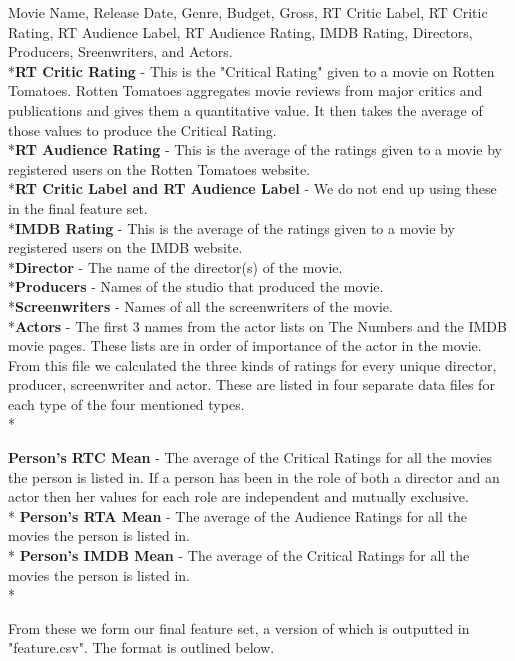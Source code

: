 \documentclass[conference]{IEEEtran}
\begin{document}
Movie Name, Release Date, Genre, Budget, Gross, RT Critic Label, RT Critic Rating, RT Audience Label, RT Audience Rating, IMDB Rating, Directors, Producers, Sreenwriters, and Actors.
\\*\textbf{RT Critic Rating} - This is the "Critical Rating" given to a movie on Rotten Tomatoes. Rotten Tomatoes aggregates movie reviews from major critics and publications and gives them a quantitative value. It then takes the average of those values to produce the Critical Rating.
\\*\textbf{RT Audience Rating} - This is the average of the ratings given to a movie by registered users on the Rotten Tomatoes website.
\\*\textbf{RT Critic Label and RT Audience Label} - We do not end up using these in the final feature set. 
\\*\textbf{IMDB Rating} - This is the average of the ratings given to a movie by registered users on the IMDB website.
\\*\textbf{Director} - The name of the director(s) of the movie.
\\*\textbf{Producers} - Names of the studio that produced the movie.
\\*\textbf{Screenwriters} - Names of all the screenwriters of the movie.
\\*\textbf{Actors} - The first 3 names from the actor lists on The Numbers and the IMDB movie pages. These lists are in order of importance of the actor in the movie.\\
From this file we calculated the three kinds of ratings for every unique director, producer, screenwriter and actor. These are listed in four separate data files for each type of the four mentioned types.\\*

\textbf{Person's RTC Mean} - The average of the Critical Ratings for all the movies the person is listed in. If a person has been in the role of both a director and an actor then her values for each role are independent and mutually exclusive.\\*
\textbf{Person's RTA Mean} - The average of the Audience Ratings for all the movies the person is listed in.\\*
\textbf{Person's IMDB Mean} - The average of the Critical Ratings for all the movies the person is listed in.\\*

From these we form our final feature set, a version of which is outputted in "feature.csv". The format is outlined below.
\end{document}
